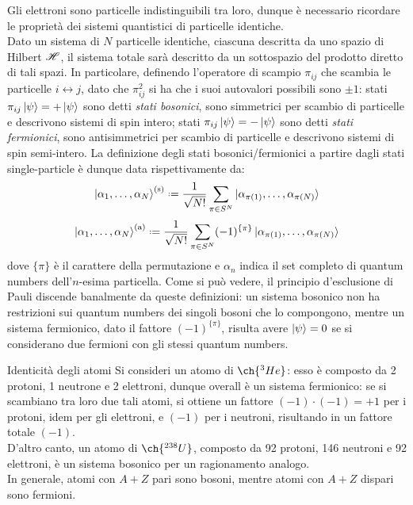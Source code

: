 Gli elettroni sono particelle indistinguibili tra loro, dunque è necessario ricordare le proprietà dei sistemi quantistici di particelle identiche. \\
Dato un sistema di $ N $ particelle identiche, ciascuna descritta da uno spazio di Hilbert $ \mathscr{H} $, il sistema totale sarà descritto da un sottospazio del prodotto diretto di tali spazi. In particolare, definendo l'operatore di scampio $ \pi_{ij} $ che scambia le particelle $ i \leftrightarrow j $, dato che $ \pi_{ij}^2 $ si ha che i suoi autovalori possibili sono $ \pm 1 $: stati $ \pi_{ij} \ket{\psi} = + \ket{\psi} $ sono detti \textit{stati bosonici}, sono simmetrici per scambio di particelle e descrivono sistemi di spin intero; stati $ \pi_{ij} \ket{\psi} = - \ket{\psi} $ sono detti \textit{stati fermionici}, sono antisimmetrici per scambio di particelle e descrivono sistemi di spin semi-intero. La definizione degli stati bosonici/fermionici a partire dagli stati single-particle è dunque data rispettivamente da:
\begin{equation}
	\ket{\alpha_1 , \dots , \alpha_N}^\text{(s)} \defeq \frac{1}{\sqrt{N!}} \sum_{\pi \in S^N} \ket{\alpha_{\pi(1)} , \dots , \alpha_{\pi(N)}}
\end{equation}
\begin{equation}
	\ket{\alpha_1 , \dots , \alpha_N}^\text{(a)} \defeq \frac{1}{\sqrt{N!}} \sum_{\pi \in S^N} (-1)^{\{\pi\}} \ket{\alpha_{\pi(1)} , \dots , \alpha_{\pi(N)}}
\end{equation}
dove $ \{\pi\} $ è il carattere della permutazione e $ \alpha_n $ indica il set completo di quantum numbers dell'$ n $-esima particella. Come si può vedere, il principio d'esclusione di Pauli discende banalmente da queste definizioni: un sistema bosonico non ha restrizioni sui quantum numbers dei singoli bosoni che lo compongono, mentre un sistema fermionico, dato il fattore $ (-1)^{\{\pi\}} $, risulta avere $ \ket{\psi} = 0 $ se si considerano due fermioni con gli stessi quantum numbers.

\begin{example}{Identicità degli atomi}{}
	Si consideri un atomo di $ \ch{^3He} $: esso è composto da 2 protoni, 1 neutrone e 2 elettroni, dunque overall è un sistema fermionico: se si scambiano tra loro due tali atomi, si ottiene un fattore $ (-1)\cdot(-1) = +1 $ per i protoni, idem per gli elettroni, e $ (-1) $ per i neutroni, risultando in un fattore totale $ (-1) $. \\
	D'altro canto, un atomo di $ \ch{^{238}U} $, composto da 92 protoni, 146 neutroni e 92 elettroni, è un sistema bosonico per un ragionamento analogo. \\
	In generale, atomi con $ A + Z $ pari sono bosoni, mentre atomi con $ A + Z $ dispari sono fermioni.
\end{example}

